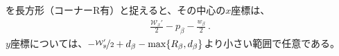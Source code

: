 \clearpage
\EndFaceBoring を長方形（コーナーR有）と捉えると、その中心の$x$座標は、
\begin{align*}
  \frac{\mathcal W_x'}2-p_\beta-\frac{w_\beta}2\ .
\end{align*}
$y$座標については、$-\nicefrac{\mathcal W_y'}2+d_\beta-\max\{R_\beta, d_\beta\}$より小さい範囲で任意である。
